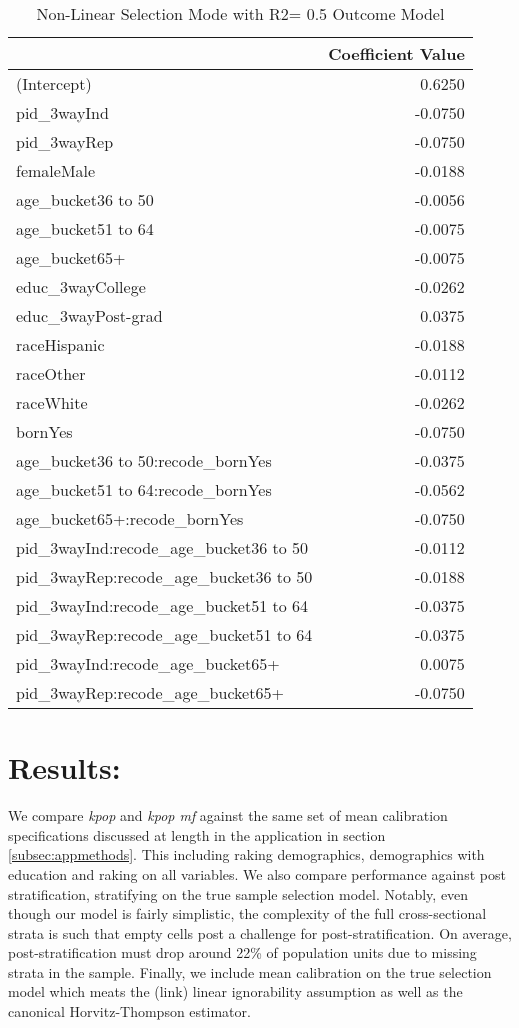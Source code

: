 \documentclass[
]{article}
\begin{document}
\begin{table}[!h]

\caption{\label{tab:r5_nonlin}Non-Linear Selection Mode with R2= 0.5 Outcome Model}
\centering
\begin{tabular}[t]{lr}
\toprule
  & Coefficient Value\\
\midrule
(Intercept) & 0.6250\\
pid\_3wayInd & -0.0750\\
pid\_3wayRep & -0.0750\\
femaleMale & -0.0188\\
age\_bucket36 to 50 & -0.0056\\
\addlinespace
age\_bucket51 to 64 & -0.0075\\
age\_bucket65+ & -0.0075\\
educ\_3wayCollege & -0.0262\\
educ\_3wayPost-grad & 0.0375\\
raceHispanic & -0.0188\\
\addlinespace
raceOther & -0.0112\\
raceWhite & -0.0262\\
bornYes & -0.0750\\
age\_bucket36 to 50:recode\_bornYes & -0.0375\\
age\_bucket51 to 64:recode\_bornYes & -0.0562\\
\addlinespace
age\_bucket65+:recode\_bornYes & -0.0750\\
pid\_3wayInd:recode\_age\_bucket36 to 50 & -0.0112\\
pid\_3wayRep:recode\_age\_bucket36 to 50 & -0.0188\\
pid\_3wayInd:recode\_age\_bucket51 to 64 & -0.0375\\
pid\_3wayRep:recode\_age\_bucket51 to 64 & -0.0375\\
\addlinespace
pid\_3wayInd:recode\_age\_bucket65+ & 0.0075\\
pid\_3wayRep:recode\_age\_bucket65+ & -0.0750\\
\bottomrule
\end{tabular}
\end{table}

\clearpage

\hypertarget{results}{%
\section{Results:}\label{results}}

We compare \textit{kpop} and \textit{kpop mf} against the same set of
mean calibration specifications discussed at length in the application
in section \ref{subsec:appmethods}. This including raking demographics,
demographics with education and raking on all variables. We also compare
performance against post stratification, stratifying on the true sample
selection model. Notably, even though our model is fairly simplistic,
the complexity of the full cross-sectional strata is such that empty
cells post a challenge for post-stratification. On average,
post-stratification must drop around 22\% of population units due to
missing strata in the sample. Finally, we include mean calibration on
the true selection model which meats the (link) linear ignorability
assumption as well as the canonical Horvitz-Thompson estimator.
\end{document}

